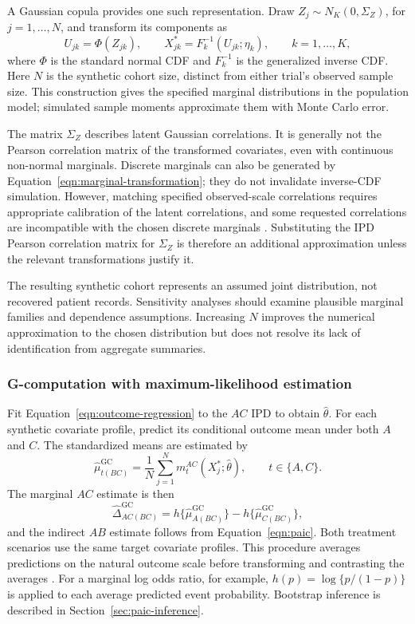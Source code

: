 \documentclass[article]{jss}
\begin{document}
A Gaussian copula provides one such representation. Draw $Z_j\sim N_K(0,\Sigma_Z)$, for $j=1,\ldots,N$, and transform its components as
\begin{equation}
\label{eqn:marginal-transformation}
U_{jk}=\Phi(Z_{jk}),\qquad
X^*_{jk}=F_k^{-1}(U_{jk};\eta_k),\qquad k=1,\ldots,K,
\end{equation}
where $\Phi$ is the standard normal CDF and $F_k^{-1}$ is the generalized inverse CDF. Here $N$ is the synthetic cohort size, distinct from either trial's observed sample size. This construction gives the specified marginal distributions in the population model; simulated sample moments approximate them with Monte Carlo error.

The matrix $\Sigma_Z$ describes latent Gaussian correlations. It is generally not the Pearson correlation matrix of the transformed covariates, even with continuous non-normal marginals. Discrete marginals can also be generated by Equation~\ref{eqn:marginal-transformation}; they do not invalidate inverse-CDF simulation. However, matching specified observed-scale correlations requires appropriate calibration of the latent correlations, and some requested correlations are incompatible with the chosen discrete marginals \citep{barbiero2017discrete}. Substituting the IPD Pearson correlation matrix for $\Sigma_Z$ is therefore an additional approximation unless the relevant transformations justify it.

The resulting synthetic cohort represents an assumed joint distribution, not recovered patient records. Sensitivity analyses should examine plausible marginal families and dependence assumptions. Increasing $N$ improves the numerical approximation to the chosen distribution but does not resolve its lack of identification from aggregate summaries.

\subsubsection{G-computation with maximum-likelihood estimation}
Fit Equation~\ref{eqn:outcome-regression} to the $AC$ IPD to obtain $\widehat\theta$. For each synthetic covariate profile, predict its conditional outcome mean under both $A$ and $C$. The standardized means are estimated by
\begin{equation}
\label{eqn:approx-marginal}
\widehat\mu^{\mathrm{GC}}_{t(BC)}=
\frac{1}{N}\sum_{j=1}^{N}m_t^{AC}(X_j^*;\widehat\theta),
\qquad t\in\{A,C\}.
\end{equation}
The marginal $AC$ estimate is then
\begin{equation}
\label{eqn:gcomp-contrast}
\widehat\Delta^{\mathrm{GC}}_{AC(BC)}=
h\{\widehat\mu^{\mathrm{GC}}_{A(BC)}\}
-h\{\widehat\mu^{\mathrm{GC}}_{C(BC)}\},
\end{equation}
and the indirect $AB$ estimate follows from Equation~\ref{eqn:paic}. Both treatment scenarios use the same target covariate profiles. This procedure averages predictions on the natural outcome scale before transforming and contrasting the averages \citep{RemiroAzocar2022a}. For a marginal log odds ratio, for example, $h(p)=\log\{p/(1-p)\}$ is applied to each average predicted event probability. Bootstrap inference is described in Section~\ref{sec:paic-inference}.
\end{document}

